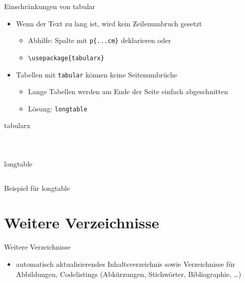 \documentclass[presentation,aspectratio=169]{beamer}
\begin{document}
\begin{frame}[fragile]{Einschränkungen von tabular}
  \begin{itemize}
    \item Wenn der Text zu lang ist, wird kein Zeilenumbruch gesetzt
      \begin{itemize}
        \item Abhilfe: Spalte mit \verb|p{...cm}| deklarieren oder
        \item \verb|\usepackage{tabularx}|
      \end{itemize}
    \item Tabellen mit \verb|tabular| können keine Seitenumbrüche
      \begin{itemize}
        \item Lange Tabellen werden am Ende der Seite einfach abgeschnitten
        \item Lösung: \verb|longtable|
      \end{itemize}
  \end{itemize}
\end{frame}

\begin{frame}[fragile]{tabularx}
  \begin{columns}
    \begin{column}{.35\textwidth}
      
    \end{column}
    \begin{column}{.55\textwidth}
      \inputminted{latex}{codebeispiele/table-tabularx.tex}
    \end{column}
  \end{columns}
\end{frame}

\begin{frame}[fragile]{longtable}
  \inputminted{latex}{codebeispiele/table-longtable.tex}
\end{frame}

\begin{frame}{Beispiel für longtable}
  
\end{frame}

\section{Weitere Verzeichnisse}

\begin{frame}[fragile]{Weitere Verzeichnisse}
  \begin{itemize}
    \item automatisch aktualisierendes Inhaltsverzeichnis sowie Verzeichnisse für Abbildungen, Codelistings (Abkürzungen, Stichwörter, Bibliographie, \dots)
  \end{itemize}
  \inputminted{latex}{codebeispiele/list-of-everything.tex}
\end{frame}
\end{document}
